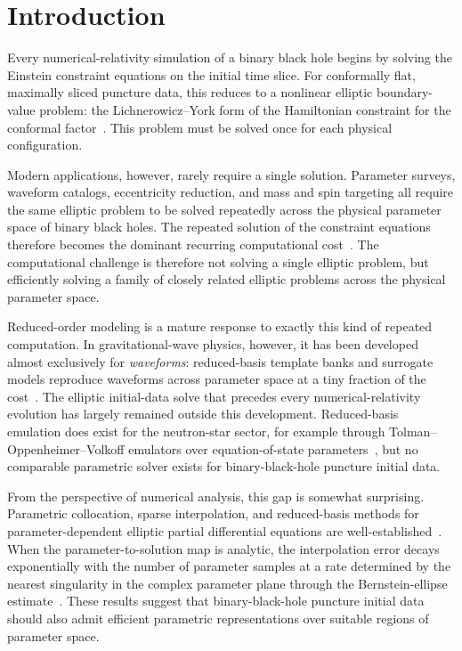 \documentclass[
  aps,
  prd,
  twocolumn,
  amsmath,
  amssymb,
  nofootinbib,
  superscriptaddress,
  floatfix,
]{revtex4-2}
\begin{document}
\maketitle

\section{Introduction}
\label{sec:intro}
Every numerical-relativity simulation of a binary black hole begins by solving the Einstein constraint equations on the initial time slice.
For conformally flat, maximally sliced puncture data, this reduces to a nonlinear elliptic boundary-value problem: the Lichnerowicz--York form of the Hamiltonian constraint for the conformal factor~\cite{York1979,BowenYork1980,BrandtBruegmann1997,Cook2000}.
This problem must be solved once for each physical configuration.


Modern applications, however, rarely require a single solution.
Parameter surveys, waveform catalogs, eccentricity reduction, and mass and spin targeting all require the same elliptic problem to be solved repeatedly across the physical parameter space of binary black holes.
The repeated solution of the constraint equations therefore becomes the dominant recurring computational cost~\cite{Mendes2025}.
The computational challenge is therefore not solving a single elliptic problem, but efficiently solving a family of closely related elliptic problems across the physical parameter space.


Reduced-order modeling is a mature response to exactly this kind of repeated computation.
In gravitational-wave physics, however, it has been developed almost exclusively for \emph{waveforms}: reduced-basis template banks and surrogate models reproduce waveforms across parameter space at a tiny fraction of the cost~\cite{FieldGalley2011,Field2014,Blackman2015,Varma2019}.
The elliptic initial-data solve that precedes every numerical-relativity evolution has largely remained outside this development.
Reduced-basis emulation does exist for the neutron-star sector, for example through Tolman--Oppenheimer--Volkoff emulators over equation-of-state parameters~\cite{Reed2024}, but no comparable parametric solver exists for binary-black-hole puncture initial data.


From the perspective of numerical analysis, this gap is somewhat surprising.
Parametric collocation, sparse interpolation, and reduced-basis methods for parameter-dependent elliptic partial differential equations are well-established~\cite{BabuskaNobileTempone2007,XiuHesthaven2005,NobileTemponeWebster2008,Haasdonk2017,HesthavenRozzaStamm2016}.
When the parameter-to-solution map is analytic, the interpolation error decays exponentially with the number of parameter samples at a rate determined by the nearest singularity in the complex parameter plane through the Bernstein-ellipse estimate~\cite{Trefethen2019}.
These results suggest that binary-black-hole puncture initial data should also admit efficient parametric representations over suitable regions of parameter space.
\end{document}
